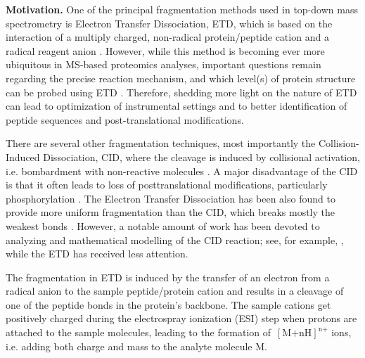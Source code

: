\documentclass{llncs}
\begin{document}

\textbf{Motivation.} One of the principal fragmentation methods used in top-down mass spectrometry is Electron Transfer Dissociation, ETD, which is based on the interaction of a multiply charged, non-radical protein/peptide cation and a radical reagent anion \cite{Syka2004-rg,Zhurov2013-ua}. However, while this method is becoming ever more ubiquitous in MS-based proteomics analyses, important questions remain regarding the precise reaction mechanism, and which level(s) of protein structure can be probed using ETD \cite{Sohn2009-zv,Sohn2015-rp}. Therefore, shedding more light on the nature of ETD can  lead to optimization of instrumental settings and to better identification of peptide sequences and post-translational modifications.

There are several other fragmentation techniques, most importantly the Col\-lision-Induced Dissociation, CID, where the cleavage is induced by collisional activation, i.e. bombardment with non-reactive molecules \cite{Mitchell_Wells2005-gn}. A major disadvantage of the CID is that it often leads to loss of posttranslational modifications, particularly phosphorylation \cite{Kim2012-yz}. The Electron Transfer Dissociation has been also found to provide more uniform fragmentation than the CID, which breaks mostly the weakest bonds \cite{Kim2012-yz,Zhurov2013-ua}. However, a notable amount of work has been devoted to analyzing and mathematical modelling of the CID reaction; see, for example, \cite{Zhang2004-fp,Zhang2005-jn,Wysocki2000-am}, while the ETD has received less attention.

The fragmentation in ETD is induced by the transfer of an electron from a radical anion to the sample peptide/protein cation and results in a cleavage of one of the peptide bonds  in the protein’s backbone. The sample cations get positively charged during the electrospray ionization (ESI) step \cite{Fenn1989-mp} when protons are attached to the sample molecules, leading to the formation of~$[\text{M+nH}]^\text{n+}$ ions, i.e. adding both charge and mass to the analyte molecule M.
\end{document}

